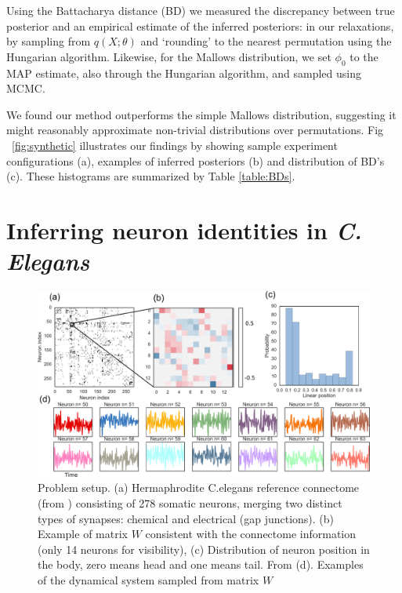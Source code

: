 \documentclass[twoside]{article}
\begin{document}
 Using the Battacharya distance (BD) we measured the discrepancy
 between true posterior and an empirical estimate of the inferred
 posteriors: in our relaxations, by sampling from $q(X; \theta)$ and `rounding'
 to the nearest permutation using the Hungarian algorithm. Likewise, for the Mallows distribution, we set $\phi_0$ to the MAP estimate, also through the Hungarian algorithm, and sampled using MCMC.
 
 We found our method outperforms the simple Mallows distribution, suggesting it might reasonably approximate non-trivial distributions over permutations. Fig ~\ref{fig:synthetic} illustrates our findings by showing sample experiment configurations (a), examples of inferred posteriors (b) and distribution of BD's (c). These histograms are summarized by Table \ref{table:BDs}.


\section{Inferring neuron identities in \textit{C. Elegans}}
\label{sec:celegans}

\begin{figure}[ht]
  \centering
  \includegraphics[width=1.0\textwidth]{../figures/figure6.pdf} 
  \caption{Problem setup. (a) Hermaphrodite C.elegans reference
    connectome (from \cite{varshney2011structural,wormatlas})
    consisting of 278 somatic neurons, merging two distinct types of
    synapses: chemical and electrical (gap junctions). (b) Example of
    matrix $W$ consistent with the connectome information (only 14
    neurons for visibility), (c) Distribution of neuron position in
    the body, zero means head and one means tail. From
    \cite{white1986structure,wormatlas} (d). Examples of the dynamical
    system sampled from matrix $W$}
  \label{fig:connectome}
\end{figure}
\end{document}
